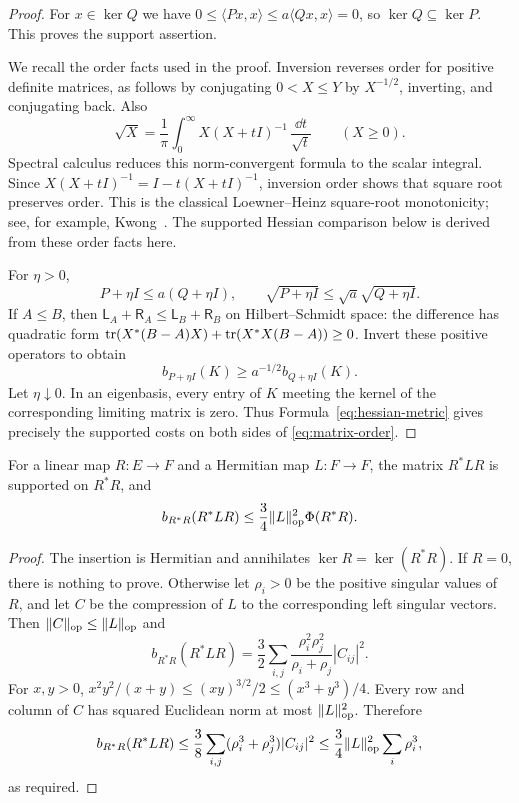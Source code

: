 \begin{proof}
For $x\in\ker Q$ we have $0\le\langle Px,x\rangle
\le a\langle Qx,x\rangle=0$, so $\ker Q\subseteq\ker P$.
This proves the support assertion.

We recall the order facts used in the proof.  Inversion reverses
order for positive definite matrices, as follows by conjugating
$0<X\le Y$ by $X^{-1/2}$, inverting, and conjugating back.  Also
\[
 \sqrt X=\frac1\pi\int_0^\infty
 X(X+tI)^{-1}\,\frac{\dd t}{\sqrt t}\qquad(X\ge0).
\]
Spectral calculus reduces this norm-convergent formula to the scalar
integral.  Since $X(X+tI)^{-1}=I-t(X+tI)^{-1}$, inversion order
shows that square root preserves order. This is the classical
Loewner--Heinz square-root monotonicity; see, for example,
Kwong~\cite[Theorem~1 and Section~2]{Kwong1975}. The supported
Hessian comparison below is derived from these order facts here.

For $\eta>0$,
\[
 P+\eta I\le a(Q+\eta I),\qquad
 \sqrt{P+\eta I}\le\sqrt a\sqrt{Q+\eta I}.
\]
If $A\le B$, then
$\mathsf L_A+\mathsf R_A\le\mathsf L_B+\mathsf R_B$ on
Hilbert--Schmidt space: the difference has quadratic form
$\operatorname{tr}(X^*(B-A)X)+\operatorname{tr}(X^*X(B-A))\ge0$.  Invert these positive
operators to obtain
\[
 b_{P+\eta I}(K)\ge a^{-1/2}b_{Q+\eta I}(K).
\]
Let $\eta\downarrow0$.  In an eigenbasis, every entry of $K$ meeting
the kernel of the corresponding limiting matrix is zero.  Thus
Formula~\eqref{eq:hessian-metric} gives precisely the supported costs
on both sides of \eqref{eq:matrix-order}.
\end{proof}

\begin{lemma}\label{lem:insertion}
For a linear map $R:E\to F$ and a Hermitian map $L:F\to F$, the
matrix $R^*LR$ is supported on $R^*R$, and
\begin{equation}\label{eq:insertion-bound}
 b_{R^*R}(R^*LR)
 \le\frac34\lVert L\rVert_{\mathrm{op}}^2\Phi(R^*R).
\end{equation}
\end{lemma}

\begin{proof}
The insertion is Hermitian and annihilates $\ker R=\ker(R^*R)$.
If $R=0$, there is nothing to prove.  Otherwise let $\rho_i>0$ be
the positive singular values of $R$, and let $C$ be the compression
of $L$ to the corresponding left singular vectors.  Then
$\lVert C\rVert_{\mathrm{op}}\le\lVert L\rVert_{\mathrm{op}}$ and
\[
 b_{R^*R}(R^*LR)
 =\frac32\sum_{i,j}
 \frac{\rho_i^2\rho_j^2}{\rho_i+\rho_j}|C_{ij}|^2.
\]
For $x,y>0$,
$x^2y^2/(x+y)\le (xy)^{3/2}/2\le(x^3+y^3)/4$.
Every row and column of $C$ has squared Euclidean norm at most
$\lVert L\rVert_{\mathrm{op}}^2$.  Therefore
\[
 b_{R^*R}(R^*LR)
 \le\frac38\sum_{i,j}(\rho_i^3+\rho_j^3)|C_{ij}|^2
 \le\frac34\lVert L\rVert_{\mathrm{op}}^2\sum_i\rho_i^3,
\]
as required.
\end{proof}

